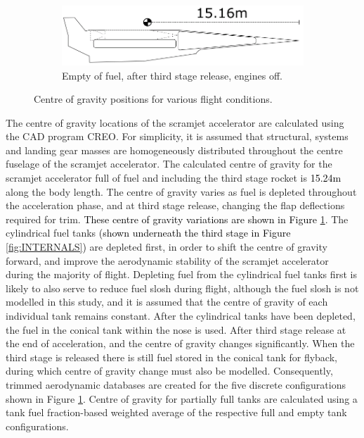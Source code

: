 \begin{figure}
\begin{subfigure}{.5\textwidth}
			\end{subfigure}
			\begin{subfigure}{.5\textwidth}
				\centering
				\includegraphics[width=0.9\linewidth]{figures/3_vehicle_design/CG5}
				\caption{Empty of fuel, after third stage release, engines off.}
				
			\end{subfigure}
			\caption{Centre of gravity positions for various flight conditions.}
			\label{fig:CentreOfGravity}
		\end{figure}
		\noindent
		The centre of gravity locations of the scramjet accelerator are calculated using the CAD program CREO\cite{CREO}. For simplicity, it is assumed that structural, systems and landing gear masses are homogeneously distributed throughout the centre fuselage of the scramjet accelerator. 
		The calculated centre of gravity for the scramjet accelerator full of fuel and including the third stage rocket is \textcolor{black}{15.24m} along the body length. The centre of gravity varies as fuel is depleted throughout the acceleration phase, and at third stage release, changing the flap deflections required for trim. \textcolor{black}{These centre of gravity variations are shown in Figure \ref{fig:CentreOfGravity}}. The cylindrical fuel tanks \textcolor{black}{(shown underneath the third stage in Figure \ref{fig:INTERNALS})} are depleted first, in order to shift the centre of gravity forward, and improve the aerodynamic stability of the scramjet accelerator during the majority of flight. Depleting fuel from the cylindrical fuel tanks first is likely to also serve to reduce fuel slosh during flight, although the fuel slosh is not modelled in this study, and it is assumed that the centre of gravity of each individual tank remains constant. After the cylindrical tanks have been depleted, the fuel in the conical tank within the nose is used. After third stage release at the end of acceleration, and the centre of gravity changes significantly. When the third stage is released there is still fuel stored in the conical tank for flyback, during which centre of gravity change must also be modelled. 
		Consequently, trimmed aerodynamic databases are created for the five discrete configurations shown in Figure \ref{fig:CentreOfGravity}. Centre of gravity for partially full tanks are calculated using a tank fuel fraction-based weighted average of the respective full and empty tank configurations. 
		
